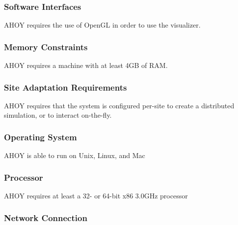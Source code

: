 \documentclass[titlepage]{article}
\begin{document}

\subsubsection{Software Interfaces%
  \label{software-interfaces}%
}

AHOY requires the use of OpenGL in order to use the visualizer.


\subsubsection{Memory Constraints%
  \label{memory-constraints}%
}

AHOY requires a machine with at least 4GB of RAM.


\subsubsection{Site Adaptation Requirements%
  \label{site-adaptation-requirements}%
}

AHOY requires that the system is configured per-site to create a distributed simulation, or to interact on-the-fly.


\subsubsection{Operating System%
  \label{operating-system}%
}

AHOY is able to run on Unix, Linux, and Mac


\subsubsection{Processor%
  \label{processor}%
}

AHOY requires at least a 32- or 64-bit x86 3.0GHz processor


\subsubsection{Network Connection%
  \label{network-connection}%
}
\end{document}
